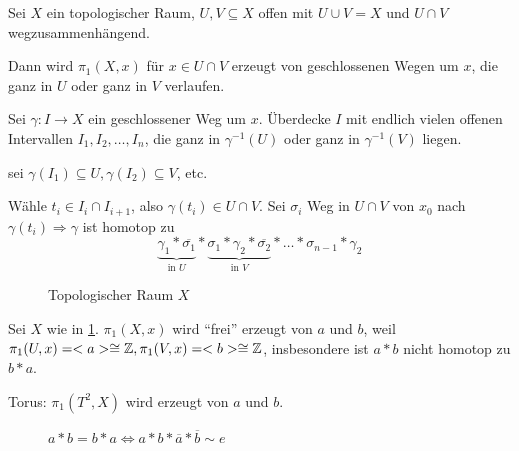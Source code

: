 \begin{satz}\label{thm:seifert-van-kampen}
    Sei $X$ ein topologischer Raum, $U, V \subseteq X$ offen mit 
    $U \cup V = X$ und $U \cap V$ wegzusammenhängend.

    Dann wird $\pi_1(X,x)$ für $x \in U \cap V$ erzeugt von geschlossenen
    Wegen um $x$, die ganz in $U$ oder ganz in $V$ verlaufen.
\end{satz}

\begin{beweis}
    Sei $\gamma: I \rightarrow X$ ein geschlossener Weg um $x$.
    Überdecke $I$ mit endlich vielen offenen Intervallen
    $I_1, I_2, \dots, I_n$, die ganz in 
    $\gamma^{-1}(U)$ oder ganz in $\gamma^{-1}(V)$ liegen.

    \Obda sei $\gamma(I_1) \subseteq U, \gamma(I_2) \subseteq V$, etc.

    Wähle $t_i \in I_i \cap I_{i+1}$, also $\gamma(t_i) \in U \cap V$.
    Sei $\sigma_i$ Weg in $U \cap V$ von $x_0$ nach $\gamma(t_i) \Rightarrow \gamma$
    ist homotop zu 
    \[\underbrace{\gamma_1 * \overline{\sigma_1}}_{\text{in } U} * \underbrace{\sigma_1 * \gamma_2 * \overline{\sigma_2}}_{\text{in } V} * \dots * \sigma_{n-1} * \gamma_2\]
\end{beweis}

\begin{beispiel}
    \begin{bspenum}
        \item
            \begin{figure}[htp]
                \centering
                
                \caption{Topologischer Raum $X$}
                \label{fig:top-raum-kreise}
            \end{figure}

            Sei $X$ wie in \cref{fig:top-raum-kreise}. $\pi_1(X,x)$ wird \enquote{frei} erzeugt von $a$ und $b$, weil
            $\pi_1(U,x) = <a> \cong \mathbb{Z}, \pi_1(V,x) = <b> \cong \mathbb{Z}$,
            insbesondere ist $a*b$ nicht homotop zu $b*a$.
        \item Torus: $\pi_1(T^2, X)$ wird erzeugt von $a$ und $b$.
            \begin{figure}[htp]
                \centering
                
                \caption{$a*b = b*a \Leftrightarrow a * b * \overline{a} * \overline{b} \sim e$}
                \label{fig:torous-a-b}
            \end{figure}
    \end{bspenum}
\end{beispiel}


